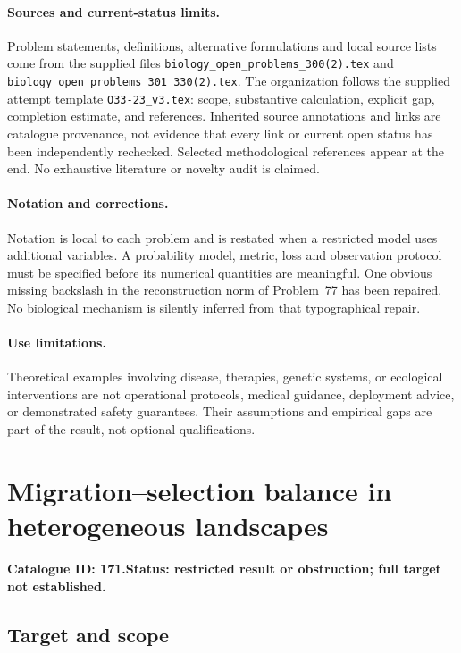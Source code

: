 \documentclass[11pt]{article}
\begin{document}
\paragraph{Sources and current-status limits.}
Problem statements, definitions, alternative formulations and local source lists
come from the supplied files
\texttt{biology\_open\_problems\_300(2).tex} and
\texttt{biology\_open\_problems\_301\_330(2).tex}.
The organization follows the supplied attempt template
\texttt{O33-23\_v3.tex}: scope, substantive calculation, explicit gap,
completion estimate, and references. Inherited source annotations and links are
catalogue provenance, not evidence that every link or current open status has
been independently rechecked. Selected methodological references appear at the
end. No exhaustive literature or novelty audit is claimed.

\paragraph{Notation and corrections.}
Notation is local to each problem and is restated when a restricted model uses
additional variables. A probability model, metric, loss and observation protocol
must be specified before its numerical quantities are meaningful. One obvious
missing backslash in the reconstruction norm of Problem~77 has been repaired.
No biological mechanism is silently inferred from that typographical repair.

\paragraph{Use limitations.}
Theoretical examples involving disease, therapies, genetic systems, or ecological
interventions are not operational protocols, medical guidance, deployment advice,
or demonstrated safety guarantees. Their assumptions and empirical gaps are part
of the result, not optional qualifications.

\setcounter{section}{170}
\section{Migration--selection balance in heterogeneous landscapes}
\label{prob:171}
\noindent\textbf{Catalogue ID: 171.}\quad \textbf{Status: restricted result or obstruction; full target not established.}
\subsection{Target and scope}
\end{document}

